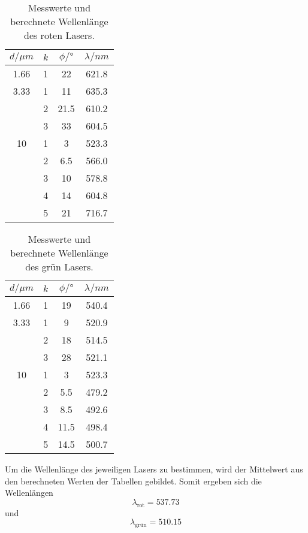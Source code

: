 \begin{table}[H]
  \centering
  \caption{Messwerte und berechnete Wellenlänge des roten Lasers.}
  \label{tab:rot}
  \begin{tabular}{c c c c}
    \toprule
    $d / \mu m$ & $k$ & $ \phi / °$ & $\lambda / nm$ \\
    \midrule
    1.66 & 1 & 22 & 621.8 \\
    \hline
    3.33 & 1 & 11 & 635.3 \\
         & 2 & 21.5 & 610.2 \\
         & 3 & 33 & 604.5 \\
    \hline
    10   & 1 & 3 & 523.3 \\
         & 2 & 6.5 & 566.0 \\
         & 3 & 10 & 578.8 \\
         & 4 & 14 & 604.8 \\
         & 5 & 21 & 716.7 \\
  \end{tabular}
\end{table}

\begin{table}[H]
  \centering
  \caption{Messwerte und berechnete Wellenlänge des grün Lasers.}
  \label{tab:grün}
  \begin{tabular}{c c c c}
    \toprule
    $d / \mu m$ & $k$ & $ \phi / °$ & $\lambda / nm$ \\
    \midrule
    1.66 & 1 & 19 & 540.4 \\
    \hline
    3.33 & 1 & 9 & 520.9 \\
         & 2 & 18 & 514.5 \\
         & 3 & 28 & 521.1 \\
    \hline
    10   & 1 & 3 & 523.3 \\
         & 2 & 5.5 & 479.2 \\
         & 3 & 8.5 & 492.6 \\
         & 4 & 11.5 & 498.4 \\
         & 5 & 14.5 & 500.7 \\
  \end{tabular}
\end{table}

Um die Wellenlänge des jeweiligen Lasers zu bestimmen, wird der Mittelwert aus den berechneten Werten der Tabellen gebildet.
Somit ergeben sich die Wellenlängen
\begin{equation*}
  \lambda_\text{rot} = 537.73
\end{equation*}
und 
\begin{equation*}
  \lambda_\text{grün} = 510.15
\end{equation*}